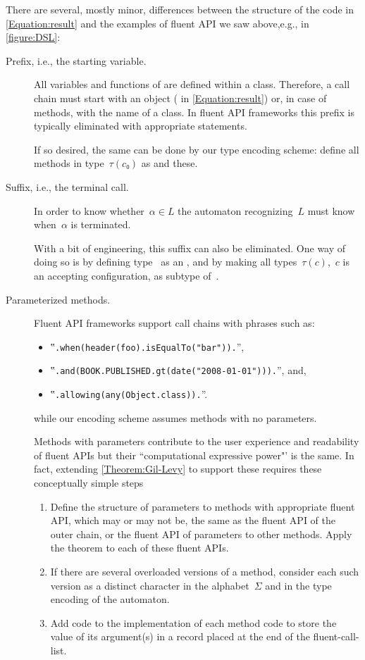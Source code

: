 \documentclass[a4paper,USenglish]{lipics-v2016}
\def\ReplaceInThesis#1#2{#1}
\begin{document}
There are several, mostly minor, differences between the structure of the \Java code
in \cref{Equation:result}
and the examples of fluent API we saw above\ReplaceInThesis{,e.g., in \cref{figure:DSL}}{}:
\begin{description}
  \item[Prefix, i.e., the starting  variable.]
  All variables and functions of \Java are defined within a class.
  Therefore, a call chain must start with an object ( in \cref{Equation:result})
  or, in case of  methods, with the name of a class.
  In fluent API frameworks this prefix is typically eliminated
  with appropriate  statements.
  \par
  If so desired, the same can be done by our type encoding scheme: define all
  methods in type~$τ(c₀)$ as  and  these.
  \item[Suffix, i.e., the terminal  call.]
  In order to know whether~$α∈L$ the automaton recognizing~$L$ must
  know when~$α$ is terminated.
  \par
  With a bit of engineering, this suffix can also be eliminated.
  One way of doing so is by defining type~ as an , and by making all types~$τ(c)$,~$c$ is
  an accepting configuration, as subtype of~.
  \item[Parameterized methods.]
  Fluent API frameworks support call chains with phrases such as:
  \begin{itemize}
    \item ‟\lstinline{.when(header(foo).isEqualTo("bar")).}”,
    \item ‟\lstinline{.and(BOOK.PUBLISHED.gt(date("2008-01-01"))).}”, and,
    \item ‟\lstinline{.allowing(any(Object.class)).}”.
  \end{itemize}
  while our encoding scheme assumes methods with no parameters.  
  \par
    Methods with parameters contribute to the user
      experience and readability of fluent APIs but their ``computational expressive power"' is the same.
      In fact, extending
      \cref{Theorem:Gil-Levy} to support these requires these conceptually simple steps 
      \begin{enumerate}
        \item Define the structure of parameters to methods with appropriate fluent API, which may or
          may not be, the same as the fluent API of the outer chain, or the fluent API of parameters to
          other methods. Apply the theorem to each of these fluent APIs.
        \item
          If there are several overloaded versions of a method, consider each such version as a distinct
          character in the alphabet~$Σ$ and in the type encoding of the automaton.
        \item
          Add code to the implementation of each method code to store the 
          value of its argument(s) in a record placed at the end of the fluent-call-list. 
      \end{enumerate}
\end{description}
 
\end{document}
